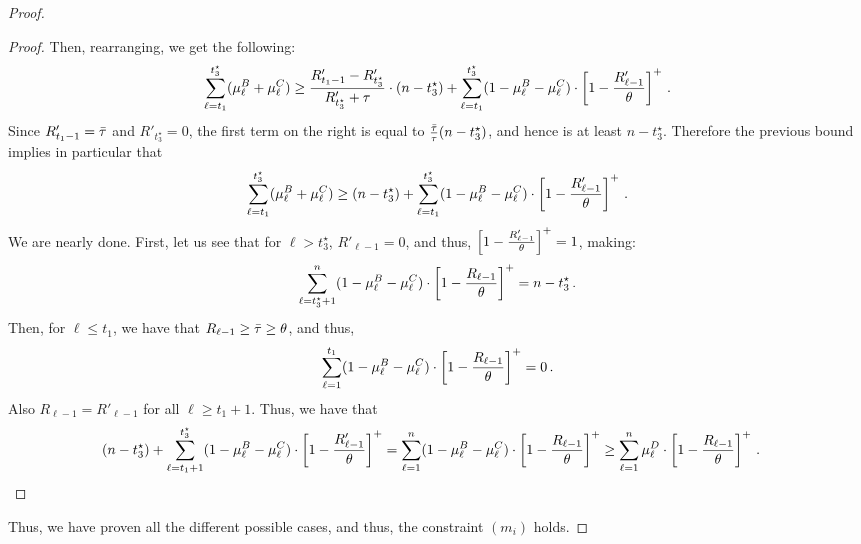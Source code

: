 \begin{proof}
\begin{proof}
        Then, rearranging, we get the following:
        \begin{equation*}
            \sum_{\ell=t_1}^{t_3^\star}(\mu_{\ell}^B+\mu_{\ell}^C) \geq \frac{R'_{t_1 - 1}-R'_{t_3^\star}}{R'_{t_3^\star}+\tau} \cdot (n-t_3^\star) + \sum_{\ell=t_1}^{t_3^\star} (1 - \mu_{\ell}^B - \mu_{\ell}^C) \cdot\left[1-\frac{R'_{\ell-1}}{\theta}\right]^+\,.
        \end{equation*}
        Since $R'_{t_1-1}=\bar\tau$ and $R'_{t_3^\star}=0$, the first term on the right is equal to $\frac{\bar\tau}{\tau}(n-t_3^\star)$, and hence is at least $n-t_3^\star$. Therefore the previous bound implies in particular that
        \begin{equation*}
            \sum_{\ell=t_1}^{t_3^\star}(\mu_{\ell}^B+\mu_{\ell}^C) \geq (n-t_3^\star) + \sum_{\ell=t_1}^{t_3^\star} (1 - \mu_{\ell}^B - \mu_{\ell}^C) \cdot\left[1-\frac{R'_{\ell-1}}{\theta}\right]^+\,.
        \end{equation*}
        We are nearly done. First, let us see that for $\ell>t_3^\star$, $R'_{\ell-1}=0$, and thus, $\left[1-\frac{R'_{\ell-1}}{\theta}\right]^+=1$, making:
        \begin{equation*}
            \sum_{\ell=t_3^\star+1}^{n} (1 - \mu_{\ell}^B - \mu_{\ell}^C) \cdot\left[1-\frac{R_{\ell-1}}{\theta}\right]^+=n-t_3^\star\,.
        \end{equation*}
        Then, for $\ell\leq t_1$, we have that $R_{\ell-1}\geq \bar\tau\geq \theta$, and thus, 
        \begin{equation*}
            \sum_{\ell=1}^{t_1} (1 - \mu_{\ell}^B - \mu_{\ell}^C) \cdot\left[1-\frac{R_{\ell-1}}{\theta}\right]^+=0\,.
        \end{equation*}
        Also $R_{\ell - 1} = R'_{\ell - 1}$ for all $\ell \geq t_1 + 1$.
        Thus, we have that
        \begin{align*}
            (n-t_3^\star) + \sum_{\ell=t_1+1}^{t_3^\star} (1 - \mu_{\ell}^B - \mu_{\ell}^C) \cdot\left[1-\frac{R'_{\ell-1}}{\theta}\right]^+
            &= \sum_{\ell=1}^{n} (1 - \mu_{\ell}^B - \mu_{\ell}^C) \cdot\left[1-\frac{R_{\ell-1}}{\theta}\right]^+
            \geq \sum_{\ell=1}^{n} \mu_{\ell}^D \cdot\left[1-\frac{R_{\ell-1}}{\theta}\right]^+\,.
        \end{align*}

    \end{proof}

    Thus, we have proven all the different possible cases, and thus, the constraint $(m_i)$ holds.
\end{proof}

